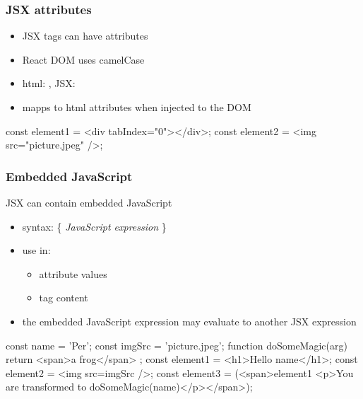 \begin{frame}[fragile] \frametitle{JSX attributes}
\begin{itemize}
  \item JSX tags can have attributes
  \item React DOM uses camelCase
  \item html: , JSX: 
  \item mapps to html attributes when injected to the DOM
\end{itemize}

\vspace{8mm}
\begin{CodeBox}{}
const element1 = <div tabIndex="0"></div>;
const element2 = <img src="picture.jpeg" />;
\end{CodeBox}
\end{frame}

\begin{frame}[fragile] \frametitle{Embedded JavaScript}
JSX can contain embedded JavaScript
\begin{itemize}
  \item syntax: \{ \emph{JavaScript expression} \}
  \item use in:
  \begin{itemize}
    \item attribute values
    \item tag content
  \end{itemize}
  \item the embedded JavaScript expression may evaluate to another JSX expression
\end{itemize}
\vspace{3mm}
\begin{CodeBox}{}
const name = 'Per';
const imgSrc = 'picture.jpeg';
function doSomeMagic(arg) { return <span>a frog</span> };
const element1 = <h1>Hello {name}</h1>;
const element2 = <img src={imgSrc} />;
const element3 = (<span>{element1}
  <p>You are transformed to {doSomeMagic(name)}</p></span>);
\end{CodeBox}
\end{frame}

